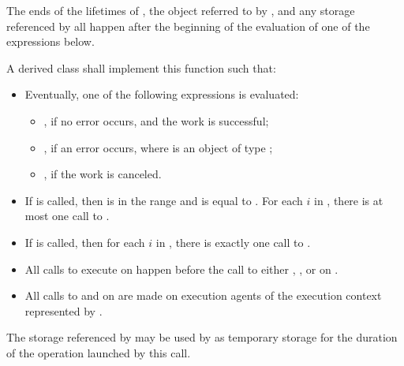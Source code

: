 \begin{itemdescr}
\pnum
\expects
The ends of
the lifetimes of ,
the object referred to by , and
any storage referenced by 
all happen after
the beginning of the evaluation of one of the expressions below.

\pnum
\effects
A derived class shall implement this function such that:
\begin{itemize}
\item
Eventually, one of the following expressions is evaluated:
\begin{itemize}
\item
{}, if no error occurs, and the work is successful;
\item
{}, if an error occurs,
where  is an object of type ;
\item
{}, if the work is canceled.
\end{itemize}
\item
If  is called,
then  is in the range  and
 is equal to .
For each $i$ in ,
there is at most one call to .
\item
If  is called,
then for each $i$ in ,
there is exactly one call to .
\item
All calls to execute on  happen before
the call to either , , or 
on .
\item
All calls to  and  on  are made
on execution agents of the execution context represented by .
\end{itemize}

\pnum
\remarks
The storage referenced by  may be used by 
as temporary storage for the duration of the operation launched by this call.
\end{itemdescr}
